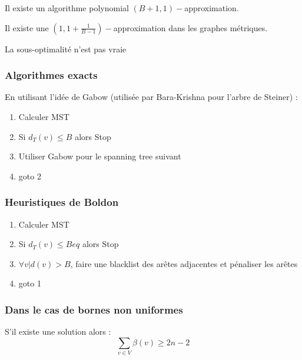 \documentclass[a4paper,11pt]{thesis}
\begin{document}
{\begin{thrm}
    Il existe un algorithme polynomial $(B+1, 1)-$approximation.
\end{thrm}

\begin{prop}
    Il existe une $(1, 1 + \frac{1}{B-1})-$approximation dans les graphes métriques.
\end{prop}

\begin{prop}
    La sous-optimalité n'est pas vraie
\end{prop}

\subsubsection{Algorithmes exacts}

En utilisant l'idée de Gabow (utilisée par Bara-Krishna pour l'arbre de Steiner) :
\begin{enumerate}
    \item Calculer MST
    \item Si $d_T(v) \leq B$ alors Stop
    \item Utiliser Gabow pour le spanning tree suivant
    \item goto 2
\end{enumerate}

\subsubsection{Heuristiques de Boldon}

\begin{enumerate}
    \item Calculer MST
    \item Si $d_T(v) \leq Beq$ alors Stop
    \item $\forall v | d(v) > B$, faire une blacklist des arêtes adjacentes et pénaliser les arêtes
    \item goto 1
\end{enumerate}

\subsubsection{Dans le cas de bornes non uniformes}

\begin{thrm}[Cierlik]
    S'il existe une solution alors :
    \begin{displaymath}
        \sum_{v \in V} \beta(v) \geq 2n - 2
    \end{displaymath}
\end{thrm}

}
\end{document}
